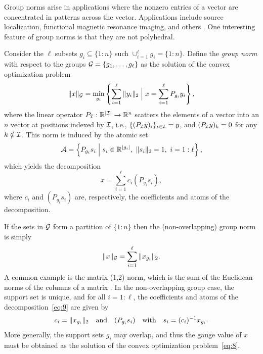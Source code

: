 Group norms arise in applications where the nonzero entries of a
vector are concentrated in patterns across the vector. Applications
include source localization, functional magnetic resonance imaging, and others
 \cite{cottraoengakreu:2005,GOR1995GRa,jacob2009group}. One interesting feature
of group norms is that they are not polyhedral. 

\begin{example}
  Consider the $\ell$ subsets $g_i\subseteq\{1:n\}$ such
  $\cup_{i=1}^\ell g_i=\{1:n\}$. Define the \emph{group norm}
  with respect to the groups $\mathcal{G}=\{g_1,\ldots,g_\ell\}$ as the
  solution of the convex optimization problem
  \begin{equation} \label{eq:8}
    \|x\|_{\mathcal{G}}=\min_{y_i}
    \left\{
      \sum_{i=1}^\ell\|y_i\|_2 \Bigm| x = \sum_{i=1}^\ell P_{g_i}y_i
    \right\},
  \end{equation}
  where the linear operator $P_{\mathcal{I}}:\mathbb{R}^{|\mathcal{I}|}\to\mathbb{R}^n$ scatters
  the elements of a vector into an $n$ vector at positions indexed by
  $\mathcal{I}$, i.e., $\{(P_{\mathcal{I}} y)_i\}_{i\in\mathcal{I}}=y$, and
  $(P_{\mathcal{I}} y)_k=0$ for any $k\notin\mathcal{I}$. This norm is induced by
  the atomic set
  \[
    \mathcal{A} = \left\{
      P_{g_i}s_i \Bigm| s_i\in\mathbb{R}^{|g_i|},\ \|s_i\|_2=1,\ i=1:\ell
    \right\},
  \]
  which yields the decomposition
  \begin{equation}\label{eq:9}
    x = \sum_{i=1}^\ell
    c_i (P_{g_i}s_i),
  \end{equation}
  where $c_i$ and $(P_{g_i}s_i)$ are, respectively, the coefficients and atoms
  of the decomposition.
  
  If the sets in $\mathcal{G}$ form a partition of $\{1:n\}$ then the
  (non-overlapping) group norm is simply
  \[
    \|x\|_{\mathcal{G}} = \sum_{i=1}^\ell\|x_{g_i}\|_2.
  \]
  A common example is the matrix (1,2) norm, which is the sum of the
  Euclidean norms of the columns of a matrix \cite{ding2006r}. In the
  non-overlapping group case, the support set is unique, and for all
  $i=1:\ell$, the coefficients and atoms of the
  decomposition~\eqref{eq:9} are given by
  \[
    c_i=\|x_{g_i}\|_2 \hbox{\quad and\quad} (P_{g_i}s_i) \hbox{\quad with\quad} s_i=(c_i)^{-1}x_{g_i}.
  \]
  More generally, the support sets $g_i$ may overlap, and thus the
  gauge value of $x$ must be obtained as the solution of the convex
  optimization problem~\eqref{eq:8}.


\end{example}
